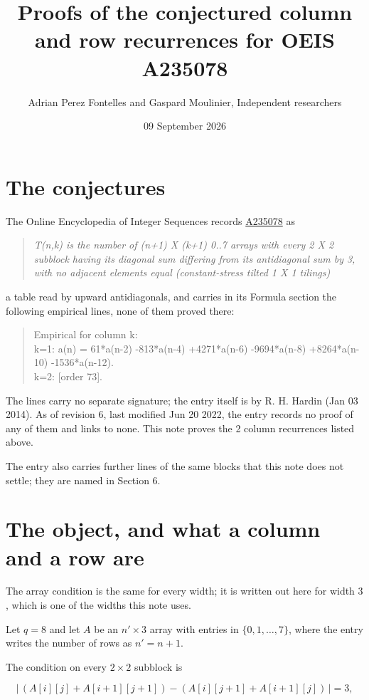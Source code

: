 \documentclass[11pt]{article}
\title{Proofs of the conjectured column and row recurrences for OEIS A235078}
\author{Adrian Perez Fontelles and Gaspard Moulinier, Independent researchers}
\date{09 September 2026}
\theoremstyle{definition}
\begin{document}
\maketitle
\section{The conjectures}

The Online Encyclopedia of Integer Sequences records \href{https://oeis.org/A235078}{A235078} as

\begin{quote}\itshape T(n,k) is the number of (n+1) X (k+1) 0..7 arrays with every 2 X 2 subblock having its diagonal sum differing from its antidiagonal sum by 3, with no adjacent elements equal (constant-stress tilted 1 X 1 tilings)\end{quote}

a table read by upward antidiagonals, and carries in its Formula section the following empirical lines, none of them proved there:

\begin{quote}\ttfamily Empirical for column k:\\
k=1: a(n) = 61*a(n-2) -813*a(n-4) +4271*a(n-6) -9694*a(n-8) +8264*a(n-10) -1536*a(n-12).\\k=2: [order 73].\end{quote}

The lines carry no separate signature; the entry itself is by R. H. Hardin (Jan 03 2014). As of revision 6, last modified Jun 20 2022, the entry records no proof of any of them and links to none. This note proves the 2 column recurrences listed above.

The entry also carries further lines of the same blocks that this note does not settle; they are named in Section 6.

\section{The object, and what a column and a row are}

The array condition is the same for every width; it is written out here for width $3$, which is one of the widths this note uses.

Let $q = 8$ and let $A$ be an $n' \times 3$ array with entries in $\{0,1,\dots,7\}$, where the entry writes the number of rows as $n' = n + 1$.

The condition on every $2 \times 2$ subblock is

\[\bigl|\,(A[i][j] + A[i{+}1][j{+}1]) - (A[i][j{+}1] + A[i{+}1][j])\,\bigr| = 3,\]
\end{document}
